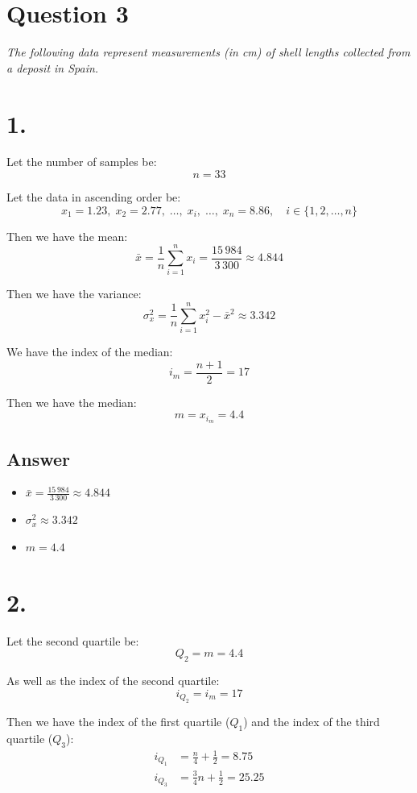 \documentclass{article}
\begin{document}
\section*{Question 3}

\textit{The following data represent measurements (in cm) of shell lengths collected from a deposit in Spain.}

\section*{1.}

Let the number of samples be:
\[
n = 33
\]

Let the data in ascending order be:
\[
x_1 = 1.23,\; x_2 = 2.77,\; \ldots,\; x_i,\; \ldots,\; x_n = 8.86,\quad i \in \{1, 2, \ldots, n\}
\]

Then we have the mean:
\[
\bar{x} = \frac{1}{n} \sum_{i=1}^n x_i = \frac{15\,984}{3\,300} \approx 4.844
\]

Then we have the variance:
\[
\sigma_x^2 = \frac{1}{n} \sum_{i=1}^n x_i^2 - \bar{x}^2 \approx 3.342
\]

We have the index of the median:
\[
i_m = \frac{n + 1}{2} = 17
\]

Then we have the median:
\[
m = x_{i_m} = 4.4
\]

\subsection*{Answer}

\begin{itemize}
    \item $\bar{x} = \frac{15\,984}{3\,300} \approx 4.844$
    \item $\sigma_x^2 \approx 3.342$
    \item $m = 4.4$
\end{itemize}

\section*{2.}

Let the second quartile be:
\[
Q_2 = m = 4.4
\]

As well as the index of the second quartile:
\[
i_{Q_2} = i_m = 17
\]

Then we have the index of the first quartile ($Q_1$) and the index of the third quartile ($Q_3$):
\[
\begin{aligned}
i_{Q_1} &= \frac{n}{4} + \frac{1}{2} = 8.75 \\
i_{Q_3} &= \frac{3}{4} n + \frac{1}{2} = 25.25
\end{aligned}
\]
\end{document}
